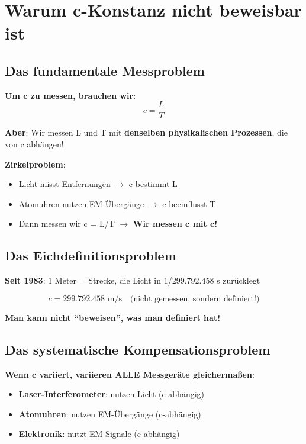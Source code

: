 	\section{Warum c-Konstanz nicht beweisbar ist}
	
	\subsection{Das fundamentale Messproblem}
	
	\textbf{Um c zu messen, brauchen wir}:
	\begin{equation}
		c = \frac{L}{T}
	\end{equation}
	
	\textbf{Aber}: Wir messen L und T mit \textbf{denselben physikalischen Prozessen}, die von c abhängen!
	
	\textbf{Zirkelproblem}:
	\begin{itemize}
		\item Licht misst Entfernungen $\rightarrow$ c bestimmt L
		\item Atomuhren nutzen EM-Übergänge $\rightarrow$ c beeinflusst T
		\item Dann messen wir c = L/T $\rightarrow$ \textbf{Wir messen c mit c!}
	\end{itemize}
	
	\subsection{Das Eichdefinitionsproblem}
	
	\textbf{Seit 1983}: 1 Meter = Strecke, die Licht in 1/299.792.458 s zurücklegt
	
	\begin{equation}
		c = 299.792.458 \text{ m/s} \quad \text{(nicht gemessen, sondern definiert!)}
	\end{equation}
	
	\textbf{Man kann nicht ``beweisen'', was man definiert hat!}
	
	\subsection{Das systematische Kompensationsproblem}
	
	\textbf{Wenn c variiert, variieren ALLE Messgeräte gleichermaßen}:
	\begin{itemize}
		\item \textbf{Laser-Interferometer}: nutzen Licht (c-abhängig)
		\item \textbf{Atomuhren}: nutzen EM-Übergänge (c-abhängig)
		\item \textbf{Elektronik}: nutzt EM-Signale (c-abhängig)
	\end{itemize}
	
